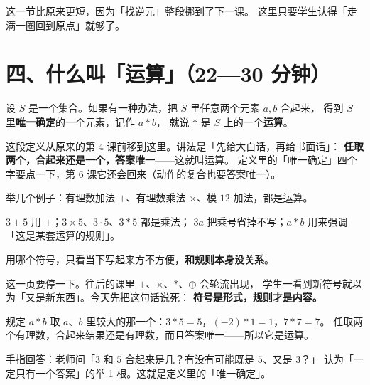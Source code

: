 \begin{zhu}
  这一节比原来更短，因为「找逆元」整段挪到了下一课。
  这里只要学生认得「走满一圈回到原点」就够了。
\end{zhu}

\section*{四、什么叫「运算」（22—30 分钟）}

\begin{definition}[运算]
  设 \(S\) 是一个集合。如果有一种办法，把 \(S\) 里任意两个元素 \(a,b\) 合起来，
  得到 \(S\) 里\textbf{唯一确定}的一个元素，记作 \(a*b\)，
  就说 \(*\) 是 \(S\) 上的一个\textbf{运算}。
\end{definition}

\begin{zhu}
  这段定义从原来的第 4 课前移到这里。讲法是「先给大白话，再给书面话」：
  \textbf{任取两个，合起来还是一个，答案唯一}——这就叫运算。
  定义里的「唯一确定」四个字要点一下，第 6 课它还会回来（动作的复合也要答案唯一）。
\end{zhu}

举几个例子：有理数加法 \(+\)、有理数乘法 \(\times\)、模 \(12\) 加法，都是运算。

\begin{example}
  \(3+5\) 用 \(+\)；\(3\times5\)、\(3\cdot5\)、\(3*5\) 都是乘法；
  \(3a\) 把乘号省掉不写；\(a*b\) 用来强调「这是某套运算的规则」。

  用哪个符号，只看当下写起来方不方便，\textbf{和规则本身没关系}。
\end{example}

\begin{zhu}
  这一页要停一下。往后的课里 \(+\)、\(\times\)、\(*\)、\(\oplus\) 会轮流出现，
  学生一看到新符号就以为「又是新东西」。今天先把这句话说死：
  \textbf{符号是形式，规则才是内容。}
\end{zhu}

\begin{example}
  规定 \(a*b\) 取 \(a\)、\(b\) 里较大的那一个：\(3*5=5\)，\((-2)*1=1\)，\(7*7=7\)。
  任取两个有理数，合起来结果还是有理数，而且答案唯一——所以它是运算。
\end{example}

\begin{caozuo}
  手指回答：老师问「\(3\) 和 \(5\) 合起来是几？有没有可能既是 \(5\)、又是 \(3\)？」
  认为「一定只有一个答案」的举 1 根。这就是定义里的「唯一确定」。
\end{caozuo}

